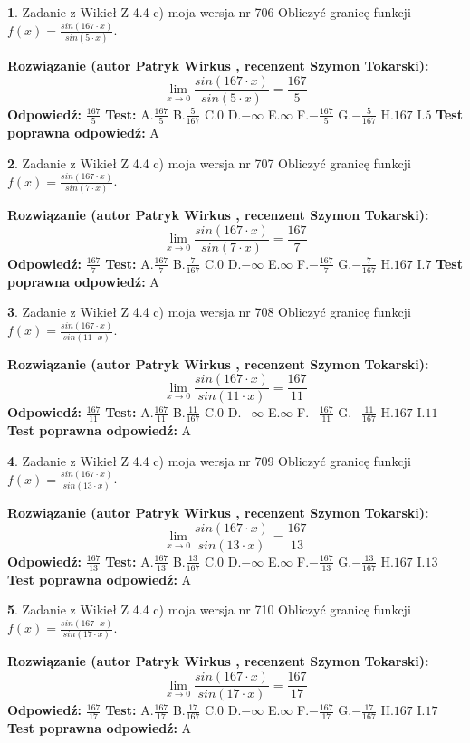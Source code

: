\documentclass[12pt, a4paper]{article}
\theoremstyle{definition} %
\newtheorem{zad}{}
\newcommand{\zadStart}[1]{\begin{zad}#1\newline}
\newcommand{\zadStop}{\end{zad}}
\newcommand{\rozwStart}[2]{\noindent \textbf{Rozwiązanie (autor #1 , recenzent #2): }\newline}
\newcommand{\rozwStop}{\newline}
\newcommand{\odpStart}{\noindent \textbf{Odpowiedź:}\newline}
\newcommand{\odpStop}{\newline}
\newcommand{\testStart}{\noindent \textbf{Test:}\newline}
\newcommand{\testStop}{\newline}
\newcommand{\kluczStart}{\noindent \textbf{Test poprawna odpowiedź:}\newline}
\newcommand{\kluczStop}{\newline}
\begin{document}
\zadStart{Zadanie z Wikieł Z 4.4 c) moja wersja nr 706}
Obliczyć granicę funkcji $f(x)=\frac{sin(167\cdot x)}{sin(5\cdot x)}$.
\zadStop
\rozwStart{Patryk Wirkus}{Szymon Tokarski}
$$\lim\limits_{x\to 0}\frac{sin(167\cdot x)}{sin(5\cdot x)}=
\frac{167}{5}$$
\rozwStop
\odpStart
$\frac{167}{5}$
\odpStop
\testStart
A.$\frac{167}{5}$
B.$\frac{5}{167}$
C.$0$
D.$-\infty$
E.$\infty$
F.$-\frac{167}{5}$
G.$-\frac{5}{167}$
H.$167$
I.$5$
\testStop
\kluczStart
A
\kluczStop



\zadStart{Zadanie z Wikieł Z 4.4 c) moja wersja nr 707}
Obliczyć granicę funkcji $f(x)=\frac{sin(167\cdot x)}{sin(7\cdot x)}$.
\zadStop
\rozwStart{Patryk Wirkus}{Szymon Tokarski}
$$\lim\limits_{x\to 0}\frac{sin(167\cdot x)}{sin(7\cdot x)}=
\frac{167}{7}$$
\rozwStop
\odpStart
$\frac{167}{7}$
\odpStop
\testStart
A.$\frac{167}{7}$
B.$\frac{7}{167}$
C.$0$
D.$-\infty$
E.$\infty$
F.$-\frac{167}{7}$
G.$-\frac{7}{167}$
H.$167$
I.$7$
\testStop
\kluczStart
A
\kluczStop



\zadStart{Zadanie z Wikieł Z 4.4 c) moja wersja nr 708}
Obliczyć granicę funkcji $f(x)=\frac{sin(167\cdot x)}{sin(11\cdot x)}$.
\zadStop
\rozwStart{Patryk Wirkus}{Szymon Tokarski}
$$\lim\limits_{x\to 0}\frac{sin(167\cdot x)}{sin(11\cdot x)}=
\frac{167}{11}$$
\rozwStop
\odpStart
$\frac{167}{11}$
\odpStop
\testStart
A.$\frac{167}{11}$
B.$\frac{11}{167}$
C.$0$
D.$-\infty$
E.$\infty$
F.$-\frac{167}{11}$
G.$-\frac{11}{167}$
H.$167$
I.$11$
\testStop
\kluczStart
A
\kluczStop



\zadStart{Zadanie z Wikieł Z 4.4 c) moja wersja nr 709}
Obliczyć granicę funkcji $f(x)=\frac{sin(167\cdot x)}{sin(13\cdot x)}$.
\zadStop
\rozwStart{Patryk Wirkus}{Szymon Tokarski}
$$\lim\limits_{x\to 0}\frac{sin(167\cdot x)}{sin(13\cdot x)}=
\frac{167}{13}$$
\rozwStop
\odpStart
$\frac{167}{13}$
\odpStop
\testStart
A.$\frac{167}{13}$
B.$\frac{13}{167}$
C.$0$
D.$-\infty$
E.$\infty$
F.$-\frac{167}{13}$
G.$-\frac{13}{167}$
H.$167$
I.$13$
\testStop
\kluczStart
A
\kluczStop



\zadStart{Zadanie z Wikieł Z 4.4 c) moja wersja nr 710}
Obliczyć granicę funkcji $f(x)=\frac{sin(167\cdot x)}{sin(17\cdot x)}$.
\zadStop
\rozwStart{Patryk Wirkus}{Szymon Tokarski}
$$\lim\limits_{x\to 0}\frac{sin(167\cdot x)}{sin(17\cdot x)}=
\frac{167}{17}$$
\rozwStop
\odpStart
$\frac{167}{17}$
\odpStop
\testStart
A.$\frac{167}{17}$
B.$\frac{17}{167}$
C.$0$
D.$-\infty$
E.$\infty$
F.$-\frac{167}{17}$
G.$-\frac{17}{167}$
H.$167$
I.$17$
\testStop
\kluczStart
A
\kluczStop
\end{document}
